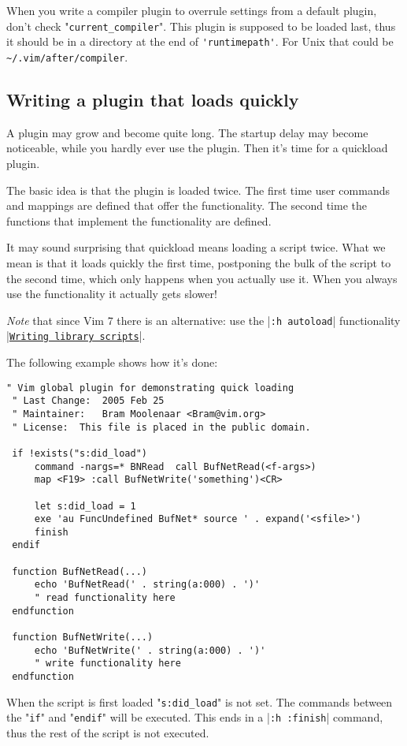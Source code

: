 When you write a compiler plugin to overrule settings from a default plugin, don't check "\verb!current_compiler!".
This plugin is supposed to be loaded last, thus it should be in a directory at the end of \verb!'runtimepath'!.
For Unix that could be \verb!~/.vim/after/compiler!.
\subsection{Writing a plugin that loads quickly}
\label{write-plugin-quickload}
A plugin may grow and become quite long.
The startup delay may become noticeable, while you hardly ever use the plugin.
Then it's time for a quickload plugin.

The basic idea is that the plugin is loaded twice.
The first time user commands and mappings are defined that offer the functionality.
The second time the functions that implement the functionality are defined.

It may sound surprising that quickload means loading a script twice.
What we mean is that it loads quickly the first time, postponing the bulk of the script to the second time, which only happens when you actually use it.
When you always use the functionality it actually gets slower!

\emph{Note} that since Vim 7 there is an alternative: use the |\verb!:h autoload!| functionality |\hyperref[Writing library scripts]{\texttt{Writing library scripts}}|.

The following example shows how it's done:

\begin{Verbatim}[samepage=true]
 " Vim global plugin for demonstrating quick loading
 " Last Change:  2005 Feb 25
 " Maintainer:   Bram Moolenaar <Bram@vim.org>
 " License:  This file is placed in the public domain.

 if !exists("s:did_load")
     command -nargs=* BNRead  call BufNetRead(<f-args>)
     map <F19> :call BufNetWrite('something')<CR>

     let s:did_load = 1
     exe 'au FuncUndefined BufNet* source ' . expand('<sfile>')
     finish
 endif

 function BufNetRead(...)
     echo 'BufNetRead(' . string(a:000) . ')'
     " read functionality here
 endfunction

 function BufNetWrite(...)
     echo 'BufNetWrite(' . string(a:000) . ')'
     " write functionality here
 endfunction
\end{Verbatim}

When the script is first loaded "\verb!s:did_load!" is not set.
The commands between the "\verb!if!" and "\verb!endif!" will be executed.
This ends in a |\verb!:h :finish!| command, thus the rest of the script is not executed.

